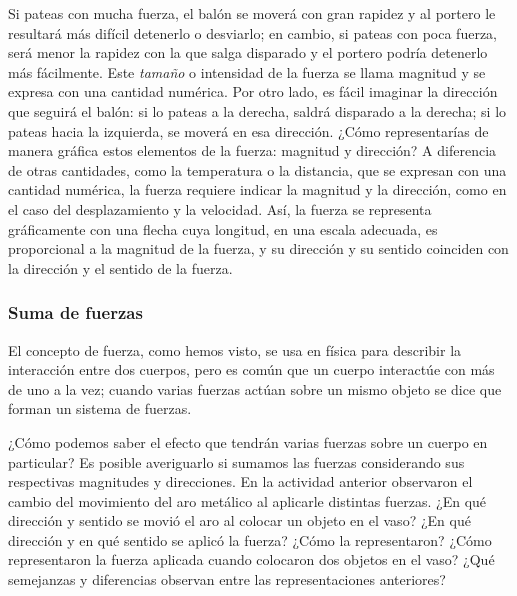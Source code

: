 \documentclass[11pt]{book}
\begin{document}
Si pateas con mucha fuerza, el balón se moverá con gran rapidez y al portero le
resultará más difícil detenerlo o desviarlo; en cambio, si pateas con poca fuerza,
será menor la rapidez con la que salga disparado y el portero podría detenerlo más
fácilmente. Este \emph{tamaño} o intensidad de la fuerza se llama magnitud y se expresa
con una cantidad numérica. Por otro lado, es fácil imaginar la dirección que seguirá
el balón: si lo pateas a la derecha, saldrá disparado a la derecha; si lo pateas
hacia la izquierda, se moverá en esa dirección. ¿Cómo representarías de manera
gráfica estos elementos de la fuerza: magnitud y dirección? A diferencia de otras
cantidades, como la temperatura o la distancia, que se expresan con una cantidad
numérica, la fuerza requiere indicar la magnitud y la dirección, como en el caso
del desplazamiento y la velocidad. Así, la fuerza se representa gráficamente con
una flecha cuya longitud, en una escala adecuada, es proporcional a la magnitud de
la fuerza, y su dirección y su sentido coinciden con la dirección y el sentido de la fuerza.

\subsubsection{Suma de fuerzas}
El concepto de fuerza, como hemos visto, se usa en física para describir la interacción
entre dos cuerpos, pero es común que un cuerpo interactúe con más de uno a la vez;
cuando varias fuerzas actúan sobre un mismo objeto se dice que forman un sistema de fuerzas.

¿Cómo podemos saber el efecto que tendrán varias fuerzas sobre un cuerpo en particular?
Es posible averiguarlo si sumamos las fuerzas considerando sus respectivas magnitudes y
direcciones. En la actividad anterior observaron el cambio del movimiento del aro metálico
al aplicarle distintas fuerzas. ¿En qué dirección y sentido se movió el aro al colocar un
objeto en el vaso? ¿En qué dirección y en qué sentido se aplicó la fuerza? ¿Cómo la representaron?
¿Cómo representaron la fuerza aplicada cuando colocaron dos objetos en el vaso?
¿Qué semejanzas y diferencias observan entre las representaciones anteriores?\\
\end{document}
